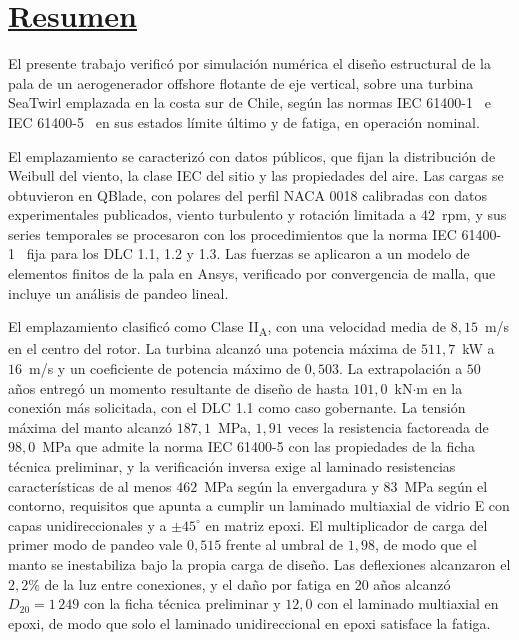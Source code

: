 \documentclass[12pt,letterpaper]{report}
\begin{document}
\newpage
\thispagestyle{empty}
\section*{\underline{Resumen}}

El presente trabajo verificó por simulación numérica el diseño estructural de la pala de un aerogenerador offshore flotante de eje vertical, sobre una turbina SeaTwirl emplazada en la costa sur de Chile, según las normas IEC 61400-1~\parencite*{IEC61400-1} e IEC 61400-5~\parencite*{IEC61400-5} en sus estados límite último y de fatiga, en operación nominal.

El emplazamiento se caracterizó con datos públicos, que fijan la distribución de Weibull del viento, la clase IEC del sitio y las propiedades del aire. Las cargas se obtuvieron en QBlade, con polares del perfil NACA 0018 calibradas con datos experimentales publicados, viento turbulento y rotación limitada a $42$~rpm, y sus series temporales se procesaron con los procedimientos que la norma IEC 61400-1~\parencite*{IEC61400-1} fija para los DLC 1.1, 1.2 y 1.3. Las fuerzas se aplicaron a un modelo de elementos finitos de la pala en Ansys, verificado por convergencia de malla, que incluye un análisis de pandeo lineal.

El emplazamiento clasificó como Clase II\textsubscript{A}, con una velocidad media de $8{,}15$~m/s en el centro del rotor. La turbina alcanzó una potencia máxima de $511{,}7$~kW a $16$~m/s y un coeficiente de potencia máximo de $0{,}503$. La extrapolación a $50$ años entregó un momento resultante de diseño de hasta $101{,}0$~kN$\cdot$m en la conexión más solicitada, con el DLC 1.1 como caso gobernante. La tensión máxima del manto alcanzó $187{,}1$~MPa, $1{,}91$ veces la resistencia factoreada de $98{,}0$~MPa que admite la norma IEC 61400-5 con las propiedades de la ficha técnica preliminar, y la verificación inversa exige al laminado resistencias características de al menos $462$~MPa según la envergadura y $83$~MPa según el contorno, requisitos que apunta a cumplir un laminado multiaxial de vidrio E con capas unidireccionales y a $\pm 45^\circ$ en matriz epoxi. El multiplicador de carga del primer modo de pandeo vale $0{,}515$ frente al umbral de $1{,}98$, de modo que el manto se inestabiliza bajo la propia carga de diseño. Las deflexiones alcanzaron el $2{,}2\%$ de la luz entre conexiones, y el daño por fatiga en 20 años alcanzó $D_{20} = 1\,249$ con la ficha técnica preliminar y $12{,}0$ con el laminado multiaxial en epoxi, de modo que solo el laminado unidireccional en epoxi satisface la fatiga.
\end{document}
